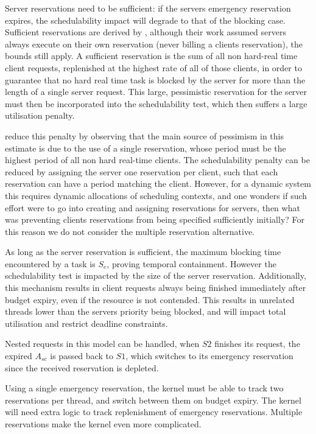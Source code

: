 Server reservations need to be sufficient: if the servers emergency reservation expires, the schedulability impact will degrade to that of the blocking case.
Sufficient reservations are derived by \citep{deNiz_LSR_01}, although their work assumed servers always execute on their own reservation (never billing a clients reservation), the bounds still apply.
A sufficient reservation is the sum of all non hard-real time client requests, replenished at the highest rate of all of those clients, in order to guarantee that no hard real time task is blocked by the server for more than the length of a single server request.
This large, pessimistic reservation for the server must then be incorporated into the schedulability test, which then suffers a large utilisation penalty.

 reduce this penalty by observing that the main source of pessimism in this estimate is due to the use of a single reservation, whose period must be the highest period of all non hard real-time clients.
The schedulability penalty can be reduced by assigning the server one reservation per client, such that each reservation can have a period matching the client.
However, for a dynamic system this requires dynamic allocations of scheduling contexts, and one wonders if such effort were to go into creating and assigning reservations for servers, then what was preventing clients reservations from being specified sufficiently initially?
For this reason we do not consider the multiple reservation alternative.

As long as the server reservation is sufficient, the maximum blocking time encountered by a task is $S_{e}$, proving temporal containment.
However the schedulability test is impacted by the size of the server reservation.
Additionally, this mechanism results in client requests always being finished immediately after budget expiry, even if the resource is not contended.
This results in unrelated threads lower than the servers priority being blocked, and will impact total utilisation and restrict deadline constraints.

Nested requests in this model can be handled, when $S2$ finishes its request, the expired $A_{sc}$ is passed back to $S1$, which switches to its emergency reservation since the received reservation is depleted.

Using a single emergency reservation, the kernel must be able to track two reservations per thread, and switch between them on budget expiry.
The kernel will need extra logic to track replenishment of emergency reservations.
Multiple reservations make the kernel even more complicated.

